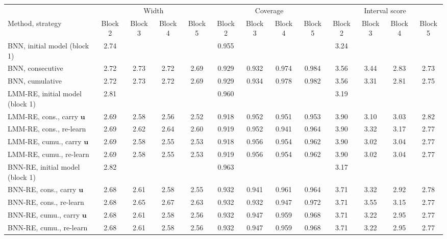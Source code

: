 \begin{tabular}{l cccc cccc cccc}
\hline
 & \multicolumn{4}{c}{Width} & \multicolumn{4}{c}{Coverage} & \multicolumn{4}{c}{Interval score} \\
\cline{2-5}\cline{6-9}\cline{10-13}
Method, strategy & Block 2 & Block 3 & Block 4 & Block 5 & Block 2 & Block 3 & Block 4 & Block 5 & Block 2 & Block 3 & Block 4 & Block 5 \\
\hline
BNN, initial model (block 1) & 2.74 & & & & 0.955 & & & & 3.24 & & & \\
BNN, consecutive & 2.72 & 2.73 & 2.72 & 2.69 & 0.929 & 0.932 & 0.974 & 0.984 & 3.56 & 3.44 & 2.83 & 2.73 \\
BNN, cumulative & 2.72 & 2.73 & 2.72 & 2.69 & 0.929 & 0.934 & 0.978 & 0.982 & 3.56 & 3.31 & 2.81 & 2.75 \\
LMM-RE, initial model (block 1) & 2.81 & & & & 0.960 & & & & 3.19 & & & \\
LMM-RE, cons., carry $\bm u$ & 2.69 & 2.58 & 2.56 & 2.52 & 0.918 & 0.952 & 0.951 & 0.953 & 3.90 & 3.10 & 3.03 & 2.82 \\
LMM-RE, cons., re-learn & 2.69 & 2.62 & 2.64 & 2.60 & 0.919 & 0.952 & 0.941 & 0.964 & 3.90 & 3.32 & 3.17 & 2.77 \\
LMM-RE, cumu., carry $\bm u$ & 2.69 & 2.58 & 2.55 & 2.53 & 0.918 & 0.956 & 0.954 & 0.962 & 3.90 & 3.02 & 3.04 & 2.77 \\
LMM-RE, cumu., re-learn & 2.69 & 2.58 & 2.55 & 2.53 & 0.919 & 0.956 & 0.954 & 0.962 & 3.90 & 3.02 & 3.04 & 2.77 \\
BNN-RE, initial model (block 1) & 2.82 & & & & 0.963 & & & & 3.17 & & & \\
BNN-RE, cons., carry $\bm u$ & 2.68 & 2.61 & 2.58 & 2.55 & 0.932 & 0.941 & 0.961 & 0.964 & 3.71 & 3.32 & 2.92 & 2.78 \\
BNN-RE, cons., re-learn & 2.68 & 2.65 & 2.67 & 2.63 & 0.932 & 0.932 & 0.947 & 0.972 & 3.71 & 3.55 & 3.15 & 2.77 \\
BNN-RE, cumu., carry $\bm u$ & 2.68 & 2.61 & 2.58 & 2.56 & 0.932 & 0.947 & 0.959 & 0.968 & 3.71 & 3.22 & 2.95 & 2.77 \\
BNN-RE, cumu., re-learn & 2.68 & 2.61 & 2.58 & 2.56 & 0.932 & 0.947 & 0.959 & 0.968 & 3.71 & 3.22 & 2.95 & 2.77 \\
\hline
\end{tabular}